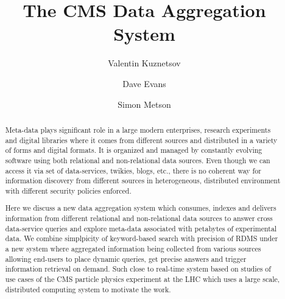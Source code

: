 \documentclass[a4paper]{jpconf}
\begin{document}
\title{The CMS Data Aggregation System}

\author{Valentin Kuznetsov}
\address{Cornell University, Ithaca, New York, USA}

\author{Dave Evans}
\address{Fermilab, Batavia, Illinois, USA}

\author{Simon Metson}
\address{Bristol University, Bristol, UK}



\begin{abstract}

Meta-data plays signiﬁcant role in a large modern enterprises, 
research experiments and digital libraries where it comes from different 
sources and distributed in a variety of forms and digital formats. 
It is organized and managed by constantly evolving software using 
both relational and non-relational data sources. 
Even though we can access it via set of data-services, twikies, blogs, etc.,
there is no coherent way for information discovery from different sources
in heterogeneous, distributed environment with different security policies enforced.

Here we discuss a new data aggregation system which consumes, 
indexes and delivers information from different relational and 
non-relational data sources to answer cross data-service queries 
and explore meta-data associated with petabytes of experimental data. 
We combine simplpicity of keyword-based search with precision of RDMS
under a new system where aggregated information being collected from various sources 
allowing end-users to place dynamic queries, get precise answers and 
trigger information retrieval on demand. Such close to real-time system 
based on studies  of use cases of the CMS particle physics experiment at 
the LHC which uses a large scale, distributed computing system to motivate the work.

\end{abstract}
\end{document}
